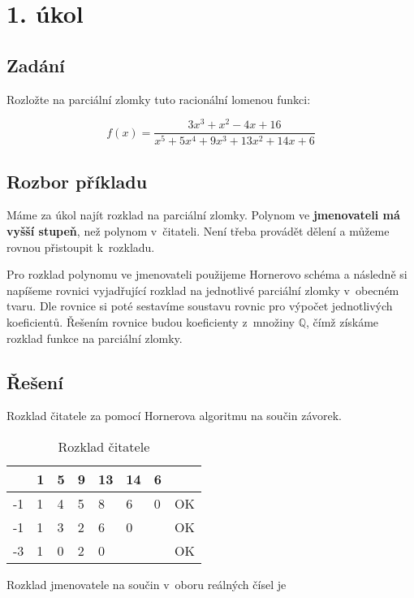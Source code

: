 \section{1. úkol}

\subsection{Zadání}
Rozložte na parciální zlomky tuto racionální lomenou funkci:

\begin{displaymath}
f(x)=\frac{3x^3+x^2-4x+16}{x^5+5x^4+9x^3+13x^2+14x+6}
\end{displaymath}

\subsection{Rozbor příkladu}
Máme za úkol najít rozklad na parciální zlomky. Polynom ve \textbf{jmenovateli má vyšší stupeň}, než polynom v~čitateli. Není třeba provádět dělení a můžeme rovnou přistoupit k~rozkladu.

Pro rozklad polynomu ve jmenovateli použijeme Hornerovo schéma a následně si napíšeme rovnici vyjadřující rozklad na jednotlivé parciální zlomky v~obecném tvaru. Dle rovnice si poté sestavíme soustavu rovnic pro výpočet jednotlivých koeficientů. Řešením rovnice budou koeficienty z~množiny $\mathbb{Q}$, čímž získáme rozklad funkce na parciální zlomky.

\subsection{Řešení}

Rozklad čitatele za pomocí Hornerova algoritmu na součin závorek.

\begin{table}[htb]
\centering
\begin{tabular}{l||l|l|l|l|l|l|l}
	 & 1 & 5 & 9 & 13 & 14 & 6 &    \\ \hline\hline
  -1 & 1 & 4 & 5 & 8  & 6  & 0 & OK \\ \hline
  -1 & 1 & 3 & 2 & 6  & 0  &   & OK \\ \hline
  -3 & 1 & 0 & 2 & 0  &    &   & OK \\
\end{tabular}
\caption{Rozklad čitatele}
\end{table}

Rozklad jmenovatele na součin v~oboru reálných čísel je

